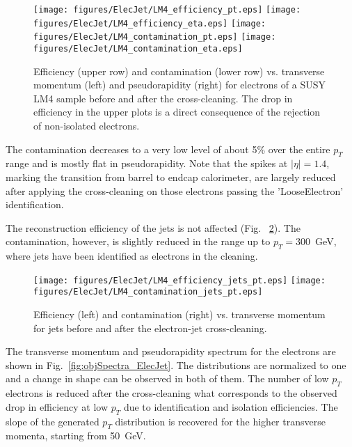 \documentclass{cmspaper}
\begin{document}
\begin{figure}[hb]
\begin{center}
    \texttt{[image: figures/ElecJet/LM4\_efficiency\_pt.eps]}
    \texttt{[image: figures/ElecJet/LM4\_efficiency\_eta.eps]}
    \texttt{[image: figures/ElecJet/LM4\_contamination\_pt.eps]}
    \texttt{[image: figures/ElecJet/LM4\_contamination\_eta.eps]}
    \caption{Efficiency (upper row) and contamination (lower row) vs. transverse
    momentum (left) and pseudorapidity (right) for electrons of a SUSY LM4
    sample before and after
    the cross-cleaning. The drop in efficiency in the upper plots is a direct
    consequence of the rejection of non-isolated electrons.} \label{fig:effCont_elec_ElecJet}
\end{center}
\end{figure}

The contamination decreases to a very low level of about 5\% over the entire $p_T$
range and is mostly flat in pseudorapidity. Note that the spikes at
$|\eta|=1.4$, marking the transition from barrel to endcap calorimeter, are
largely reduced after applying the cross-cleaning on those electrons passing the
'LooseElectron' identification.

The reconstruction efficiency of the jets is not affected (Fig.
~\ref{fig:effCont_Jets_ElecJet}). The contamination, however, is slightly reduced
in the range up to $p_T=300$~GeV, where jets have been identified as electrons in
the cleaning.
\begin{figure}[htb]
\begin{center}
    \texttt{[image: figures/ElecJet/LM4\_efficiency\_jets\_pt.eps]}
    \texttt{[image: figures/ElecJet/LM4\_contamination\_jets\_pt.eps]}
    \caption{Efficiency (left) and contamination (right) vs. transverse momentum
    for jets before and after the electron-jet cross-cleaning.}
\label{fig:effCont_Jets_ElecJet}
\end{center}
\end{figure}


The transverse momentum and pseudorapidity spectrum for the electrons are shown
in Fig.~\ref{fig:objSpectra_ElecJet}. The distributions are normalized to one
and a change in shape can be observed in both of them. The number of low $p_T$
electrons is reduced after the cross-cleaning what corresponds to the observed
drop in efficiency at low $p_T$ due to identification and isolation
efficiencies. The slope of the generated $p_T$ distribution is recovered for
the higher transverse momenta, starting from 50\ GeV.
\end{document}
